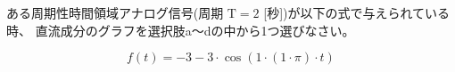 ある周期性時間領域アナログ信号(周期 $\textrm{T} = 2$ [秒])が以下の式で与えられている時、
直流成分のグラフを選択肢a〜dの中から1つ選びなさい。

\[
f(t) = 
-3
- 3 \cdot \cos( 1 \cdot (1\cdot \pi) \cdot t )
\]
